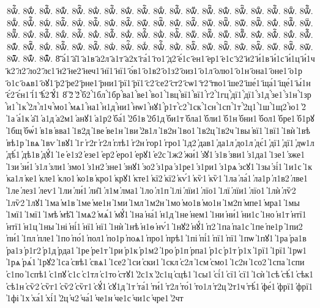 {8ѿⷢ҇.
8ѿⷣ.
8ѿⷣ҇.
8ѿⷤ.
8ѿⷤ҇.
8ѿⷥ.
8ѿⷥ҇.
8ѿⷦ.
8ѿⷦ҇.
8ѿⷧ.
8ѿⷧ҇.
8ѿⷨ.
8ѿⷨ҇.
8ѿⷩ.
8ѿⷩ҇.
8ѿⷪ.
8ѿⷪ҇.
8ѿⷫ.
8ѿⷫ҇.
8ѿⷬ.
8ѿⷬ҇.
8ѿⷭ.
8ѿⷭ҇.
8ѿⷮ.
8ѿⷮ҇.
8ѿⷯ.
8ѿⷯ҇.
8ѿⷰ.
8ѿⷰ҇.
8ѿⷱ.
8ѿⷱ҇.
8ѿⷲ.
8ѿⷲ҇.
8ѿⷳ.
8ѿⷳ҇.
8ѿⷴ.
8ѿⷴ҇.
8ѿⷵ.
8ѿⷵ҇.
8ѿⷶ.
8ѿⷶ҇.
8ѿⷷ.
8ѿⷷ҇.
8ѿⷸ.
8ѿⷸ҇.
8ѿⷹ.
8ѿⷹ҇.
8ѿⷺ.
8ѿⷺ҇.
8ѿⷻ.
8ѿⷻ҇.
8ѿⷼ.
8ѿⷼ҇.
8ѿⷽ.
8ѿⷽ҇.
8ѿⷾ.
8ѿⷾ҇.
8ѿⷿ.
8ѿⷿ҇.
8ѿꙴ.
8ѿꙴ҇.
8ѿꙵ.
8ѿꙵ҇.
8ѿꙶ.
8ѿꙶ҇.
8ѿꙷ.
8ѿꙷ҇.
8ѿꙸ.
8ѿꙸ҇.
8ѿꙹ.
8ѿꙹ҇.
8ѿꙺ.
8ѿꙺ҇.
8ѿꙻ.
8ѿꙻ҇.
8ѿ꙼.
8ѿ꙼҇.
8ѿ꙽.
8ѿ꙽҇.
8҃
҃а́1
҃а̑1
҃а1в
҃а2л
҃а1т
҃а2х
҃га́1
҃го1
҃д2
҃е́1с
҃ен1
҃ер1
҃е1с
҃з2
҃и2
҃и́1в
҃и́1с
҃и́1ц
҃и́1ч
҃к2
҃л2
҃ло2
҃лє1
҃н2
҃не2
҃неч1
҃нї1
҃нї1
҃о́в1
҃о1в2
҃о1з2
҃оиз1
҃о1л
҃олю1
҃о1н
҃она1
҃оне1
҃о1р
҃о1с
҃оѧв1
҃оꙋ1
҃р2
҃ре2
҃рне1
҃рни1
҃рї1
҃рї1
҃с2
҃се2
҃ст2
҃сѡ1
҃т2
҃тво1
҃ше2
҃ше́1
҃ща́1
҃ще́1
҃ы́1н
҃є́2
҃є́н1
҃і́1
҃ѣ́2
҃ꙋ́1
8҆
҆2̀
҆2́
҆́б2
҆́1бл
҆́1бр
҆́ва1
҆́ве1
҆́во1
҆́1вц
҆́вї1
҆́вї1
҆́г2
҆́1гц
҆́дї1
҆́дї1
҆́з1д
҆́зе1
҆́з1н
҆́1зр
҆́и1
҆́1к
҆́2л
҆́л1ч
҆́мо1
҆́мѧ1
҆́на1
҆́н1д
҆́ни1
҆́нѡ1
҆́нꙋ1
҆́р1т
҆́с2
҆́1ск
҆́1сн
҆́1сп
҆́1т
҆́2ц1
҆́1ш
҆́1щ2
҆́ю1
҆2̑
҆1а
҆а́1к
҆а̑1
҆а1д
҆а2м1
҆анꙋ1
҆а1р2
҆ба́1
҆2б1в
҆2б1д
҆би1т
҆бла1
҆бли1
҆б1н
҆бни1
҆бол1
҆бре1
҆б1рꙋ
҆1бщ
҆бѡ́1
҆в1в
҆вва1
҆1в2д
҆1ве
҆ве1н
҆1ви
҆2в1л
҆1в2н
҆1во1
҆1в2ц
҆1в2ч
҆1вы
҆вї1
҆1вї1
҆1вѝ
҆1вѣ
҆вѣ1р
҆1вѧ
҆1вѵ
҆1вꙋ1
҆1г
҆г2г
҆г2л
҆глѣ1
҆г2н
҆гор1
҆гро1
҆1д2
҆дав1
҆да1л
҆до1л
҆дє́1
҆дї1
҆дї1
҆дѡ1л
҆дѣ́1
҆дѣ1в
҆дꙋ́1
҆1е
҆е1з2
҆езе1
҆ер2
҆еро1
҆ерꙋ1
҆е2с
҆1ж2
҆жи́1
҆з̾ꙋ1
҆з1в
҆зви1
҆з1да1
҆1зе1
҆зже1
҆1зи
҆зи́1
҆з1л
҆зли1
҆змо1
҆з1н2
҆зне1
҆знꙋ1
҆зо2
҆з1ра
҆з1ре1
҆з1ри1
҆з1рѧ
҆зсꙋ1
҆1зы
҆зі́1
҆1и1с
҆1к
҆ка1л
҆ке1
҆кле1
҆кло1
҆ко1в
҆кро1
҆крꙋ1
҆кте1
҆кї2
҆кї2
҆кѵ́1
҆кѷ1
҆кѷ1
҆1ла
҆ла́1
҆ла1р
҆л1в2
҆лве1
҆1ле
҆лез1
҆леѵ1
҆1ли
҆ли́1
҆ли̑1
҆л1м
҆лма1
҆1ло
҆л1п
҆1лі
҆лїи1
҆лїо1
҆1лї
҆лїи1
҆лїо1
҆1лѝ
҆лѷ2
҆1лѷ2
҆1лꙋ1
҆1ма
҆м1в
҆1ме
҆ме1н
҆1ми
҆1мл
҆1м2н
҆1мо
҆мо1в
҆мо1н
҆1м2п
҆мпе1
҆мра1
҆1мы
҆1мї1
҆1мї1
҆1мѣ
҆мѣ̑1
҆1мѧ2
҆мѧ́1
҆мꙋ́1
҆1на
҆на́1
҆н1д
҆1не
҆нем1
҆1ни
҆ни́1
҆ни1с
҆1но
҆н1т
҆нтї1
҆нтї1
҆н1ц
҆1ны
҆1ні
҆ні́1
҆нї1
҆нї1
҆1нѝ
҆1нѣ
҆н1ѳ
҆нѵ́1
҆1нꙋ2
҆нꙋ́1
҆п2
҆1па
҆па1с
҆1пе
҆пе1р
҆1пи2
҆пи́1
҆1пл
҆пле1
҆1по
҆по́1
҆пол1
҆по1р
҆поѧ1
҆про1
҆прѣ1
҆1пі
҆пі́1
҆пї1
҆пї1
҆1пѡ
҆1пꙋ1
҆1ра
҆ра1в
҆ра1з
҆р1г2
҆р1д
҆рда1
҆1ре
҆ре1т
҆1ри
҆р1к
҆р1м2
҆1ро
҆р1п
҆рпа1
҆р1с
҆р1т
҆р1х
҆1рї1
҆1рї1
҆1рѡ1
҆1рѧ
҆рѧ́1
҆1рꙋ2
҆1са
҆свѣ1
҆свѧ1
҆1се2
҆1си
҆ски1
҆1скл
҆с2л
҆1см
҆смо1
҆1с2н
҆1со2
҆1спа
҆1спи
҆с1по
҆1спѣ1
҆с1пꙋ
҆с1с
҆с1тл
҆с1то
҆стꙋ1
҆2с1х
҆2с1ц
҆сцѣ1
҆1сы1
҆сі́1
҆сї1
҆сї1
҆1сѝ
҆1сѣ
҆сѣ́1
҆сѣк1
҆сѣ1н
҆сѷ2
҆сѷг1
҆сѷ2
҆сѷг1
҆сꙋ́1
҆сꙋ1д
҆1т
҆та́1
҆ти́1
҆т2л
҆то́1
҆то1л
҆т2ц
҆2т1ч
҆тѣ́1
҆фе́1
҆фрї1
҆фрї1
҆1фі
҆1х
҆ха́1
҆хі́1
҆2ц
҆ч2
҆ча́1
҆че1н
҆че1с
҆чи1с
҆чре1
҆2чт
}
